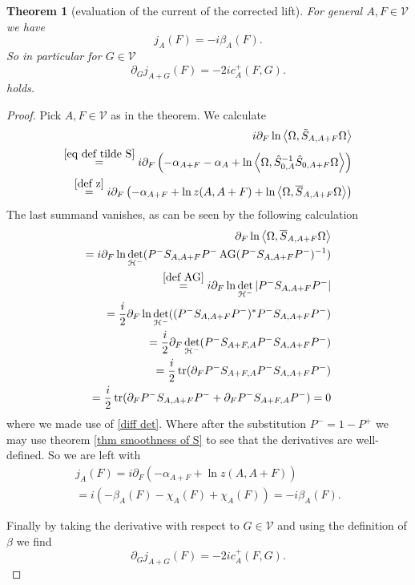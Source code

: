 \documentclass[b5paper,draft,openbib,12pt]{memoir}
\newtheorem{Thm}[Def]{Theorem}
\DeclareMathOperator{\tr}{tr}
\DeclareMathOperator{\AG}{AG}
\begin{document}
\begin{Thm}[evaluation of the current of the corrected lift]
For general \(A,F\in\mathcal{V}\) we have
\begin{equation}
j_A(F)=-i\beta_A(F).
\end{equation}
So in particular for \(G\in\mathcal{V}\)
\begin{equation}
\partial_G j_{A+G}(F)=-2i c^+_A(F,G).
\end{equation}
holds.
\end{Thm}
\begin{proof}
Pick \(A,F\in\mathcal{V}\) as in the theorem. We calculate
\begin{align}
i\partial_F \ln \left\langle\Omega, \tilde{S}_{A,A+F}\Omega\right\rangle\\
\overset{\eqref{eq def tilde S}}{=}i\partial_F\left( -\alpha_{A+F}-\alpha_A + \ln \left\langle\Omega, \hat{S}_{0,A}^{-1} \hat{S}_{0,A+F}\Omega\right\rangle\right)\\
\overset{\eqref{def z}}{=}i\partial_F\left( -\alpha_{A+F}+\ln z(A,A+F) + \ln \left\langle\Omega, \overline{S}_{A,A+F}\Omega\right\rangle\right)
\end{align}
The last summand vanishes, as can be seen by the following calculation
\begin{align}
\partial_{F} \ln \left\langle \Omega, \overline{S}_{A,A+F}\Omega\right\rangle\\
=i\partial_F\ln \det_{\mathcal{H}^-} (P^-S_{A,A+F}P^-\AG(P^-S_{A,A+F}P^-)^{-1})\\
\overset{\eqref{def AG}}{=}i\partial_F\ln \det_{\mathcal{H}^-} |P^-S_{A,A+F}P^-|\\
=\frac{i}{2} \partial_F \ln \det_{\mathcal{H}^-} ((P^- S_{A,A+F}P^-)^*P^- S_{A,A+F}P^-)\\
=\frac{i}{2} \partial_F \det_{\mathcal{H}^-} (P^- S_{A+F,A}P^-S_{A,A+F}P^-)\\
=\frac{i}{2}\tr(\partial_F P^-S_{A+F,A}P^-S_{A,A+F}P^-)\\
=\frac{i}{2}\tr(\partial_F P^-S_{A,A+F}P^-+\partial_F P^-S_{A+F,A}P^-)=0\end{align}
where we made use of \eqref{diff det}.
Where after the substitution \(P^-=1-P^+\) we may use 
theorem \ref{thm smoothness of S} 
to see that the derivatives are well-defined.
So we are left with
\begin{align}
j_A(F)=i\partial_F (-\alpha_{A+F}+\ln z(A,A+F))\\
=i(-\beta_A(F)-\chi_A(F)+\chi_A(F))=-i\beta_A(F).
\end{align}

Finally by taking the derivative with respect to \(G\in\mathcal{V}\) and using the definition of \(\beta\) we find
\begin{equation}
\partial_G j_{A+G}(F)=-2i c_A^+(F,G).
\end{equation}


\end{proof}
\end{document}
